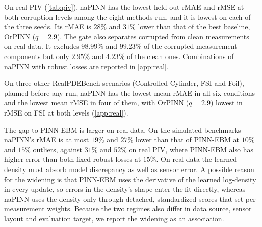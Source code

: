 \documentclass[twoside]{article}
\begin{document}
On real PIV (\cref{tab:piv}), naPINN has the lowest held-out rMAE and rMSE at
both corruption levels among the eight methods run, and it is lowest on each of
the three seeds. Its rMAE is $28\%$ and $31\%$ lower than that of the best baseline,
OrPINN ($q = 2.9$). The gate also separates corrupted from clean measurements
on real data. It excludes $98.99\%$ and $99.23\%$ of the corrupted measurement
components but only $2.95\%$ and $4.23\%$ of the clean ones. Combinations of naPINN with robust losses are
reported in \cref{app:real}.

On three other RealPDEBench scenarios (Controlled Cylinder, FSI and Foil),
planned before any run, naPINN has
the lowest mean rMAE in all six conditions and the lowest mean rMSE in four of
them, with OrPINN ($q = 2.9$) lowest in rMSE on FSI at both levels
(\cref{app:real}).

The gap to PINN-EBM is larger on real data. On the simulated benchmarks
naPINN's rMAE is at most $19\%$ and $27\%$ lower than that of PINN-EBM at $10\%$
and $15\%$ outliers, against $31\%$ and $52\%$ on real PIV, where PINN-EBM also
has higher error than both fixed robust losses at $15\%$. On real data the learned density
must absorb model discrepancy as well as sensor error. A possible reason for the
widening is that PINN-EBM uses the derivative of the learned log-density in
every update, so errors in the density's shape enter the fit directly, whereas
naPINN uses the density only through detached, standardized scores that set
per-measurement weights. Because the two regimes also
differ in data source, sensor layout and evaluation target, we report the
widening as an association.
\end{document}
